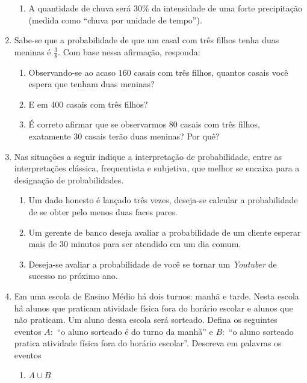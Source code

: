 \begin{enumerate}
\begin{enumerate}
\item {} 
A quantidade de chuva será $30\%$ da intensidade de uma forte precipitação (medida como “chuva por unidade de tempo”).

\end{enumerate}

\item Sabe-se que a probabilidade de que um casal com três filhos tenha duas meninas é \(\frac{3}{8}\). Com base nessa afirmação, responda:
\begin{enumerate}
\item {} 
Observando-se ao acaso $160$ casais com três filhos, quantos casais você espera que tenham duas meninas?

\item {} 
E em 400 casais com três filhos?

\item {} 
É correto afirmar que se observarmos $80$ casais com três filhos, exatamente 30 casais terão duas meninas? Por quê?

\end{enumerate}


\item Nas situações a seguir indique a interpretação de probabilidade, entre as interpretações clássica, frequentista e subjetiva, que melhor se encaixa para a designação de probabilidades.
\begin{enumerate}
\item {} 
Um dado honesto é lançado três vezes, deseja-se calcular a probabilidade de se obter pelo menos duas faces pares.

\item {} 
Um gerente de banco deseja avaliar a probabilidade de um cliente esperar mais de $30$ minutos para ser atendido em um dia comum.

\item {} 
Deseja-se avaliar a probabilidade de você se tornar um \textit{Youtuber} de sucesso no próximo ano.

\end{enumerate}

\item Em uma escola de Ensino Médio há dois turnos: manhã e tarde. Nesta escola há alunos que praticam atividade física fora do horário escolar e alunos que não praticam. Um aluno dessa escola será sorteado. Defina os seguintes eventos \(A:\) “o aluno sorteado é do turno da manhã”{} e \(B:\) “o aluno sorteado pratica atividade física fora do horário escolar”. Descreva em palavras os eventos
\begin{enumerate}
\item {} 
\(A\cup B\)


\end{enumerate}
\end{enumerate}
